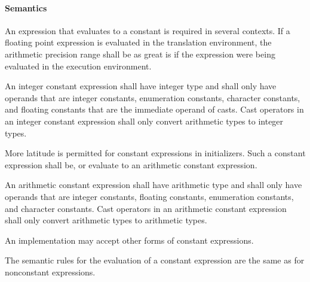 \documentclass{article}
\begin{document}
\paragraph*{Semantics}
An expression that evaluates to a constant is required in several contexts. If a floating
point expression is evaluated in the translation environment, the arithmetic precision range
shall be as great is if the expression were being evaluated in the execution environment.
\linebreak

An integer constant expression shall have integer type and shall only have operands that 
are integer constants, enumeration constants, character constants, and floating constants
that are the immediate operand of casts. Cast operators in an integer constant expression 
shall only convert arithmetic types to integer types.
\linebreak

More latitude is permitted for constant expressions in initializers. Such a constant expression
shall be, or evaluate to an arithmetic constant expression.
\linebreak

An arithmetic constant expression shall have arithmetic type and shall only have operands that
are integer constants, floating constants, enumeration constants, and character constants. Cast
operators in an arithmetic constant expression shall only convert arithmetic types to arithmetic
types.
\linebreak

An implementation may accept other forms of constant expressions.
\linebreak

The semantic rules for the evaluation of a constant expression are the same as for nonconstant
expressions.




\end{document}
